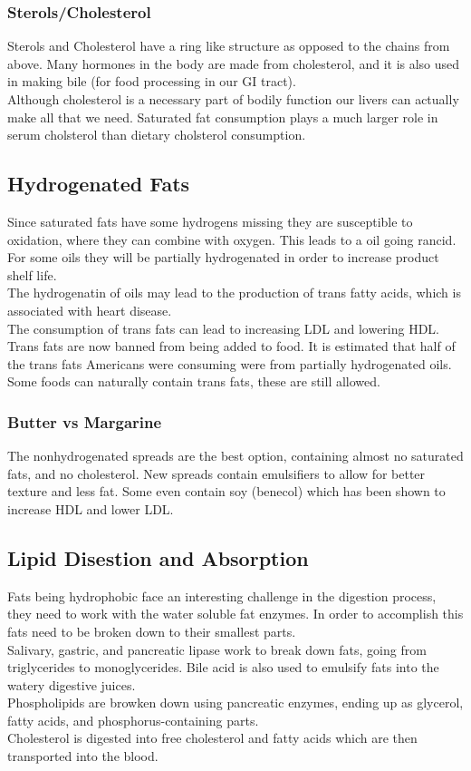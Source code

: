 \documentclass[letterpaper, 11pt]{article}
\begin{document}
\subsubsection{Sterols/Cholesterol}
\label{sec:org92bfdb3}
Sterols and Cholesterol have a ring like structure as opposed to the chains from above. Many hormones in the body are made from cholesterol, and it is also used in making bile (for food processing in our GI tract).\\
Although cholesterol is a necessary part of bodily function our livers can actually make all that we need. Saturated fat consumption plays a much larger role in serum cholsterol than dietary cholsterol consumption.\\
\subsection{Hydrogenated Fats}
\label{sec:org4061add}
Since saturated fats have some hydrogens missing they are susceptible to oxidation, where they can combine with oxygen. This leads to a oil going rancid. For some oils they will be partially hydrogenated in order to increase product shelf life.\\
The hydrogenatin of oils may lead to the production of trans fatty acids, which is associated with heart disease.\\
The consumption of trans fats can lead to increasing LDL and lowering HDL.\\
Trans fats are now banned from being added to food. It is estimated that half of the trans fats Americans were consuming were from partially hydrogenated oils. Some foods can naturally contain trans fats, these are still allowed.\\
\subsubsection{Butter vs Margarine}
\label{sec:org8d16c72}
The nonhydrogenated spreads are the best option, containing almost no saturated fats, and no cholesterol. New spreads contain emulsifiers to allow for better texture and less fat. Some even contain soy (benecol) which has been shown to increase HDL and lower LDL.\\
\subsection{Lipid Disestion and Absorption}
\label{sec:orge67b3c2}
Fats being hydrophobic face an interesting challenge in the digestion process, they need to work with the water soluble fat enzymes. In order to accomplish this fats need to be broken down to their smallest parts.\\
Salivary, gastric, and pancreatic lipase work to break down fats, going from triglycerides to monoglycerides. Bile acid is also used to emulsify fats into the watery digestive juices.\\
Phospholipids are browken down using pancreatic enzymes, ending up as glycerol, fatty acids, and phosphorus-containing parts.\\
Cholesterol is digested into free cholesterol and fatty acids which are then transported into the blood.\\
\end{document}
